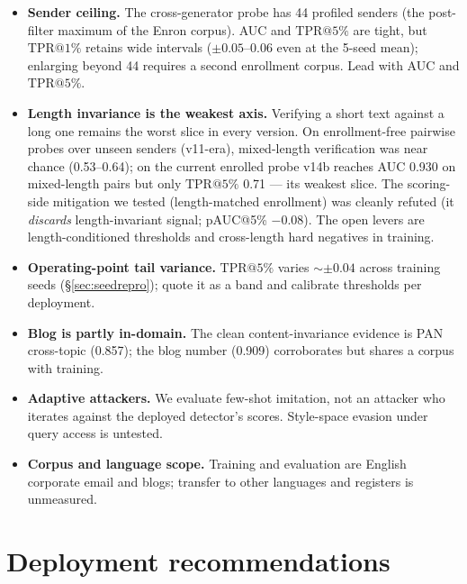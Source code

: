 \documentclass[11pt]{article}
\makeatletter
\newcommand{\tprat}[1]{\ensuremath{\mathrm{TPR}@#1\%}}
\newcommand{\vbest}{v14b}
\makeatother
\begin{document}
\begin{itemize}[leftmargin=2em]
\item \textbf{Sender ceiling.} The cross-generator probe has 44 profiled senders (the post-filter
      maximum of the Enron corpus). AUC and \tprat{5} are tight, but \tprat{1} retains wide
      intervals (${\pm}0.05$--$0.06$ even at the 5-seed mean); enlarging beyond 44 requires a second
      enrollment corpus. Lead with AUC and \tprat{5}.
\item \textbf{Length invariance is the weakest axis.} Verifying a short text against a long one
      remains the worst slice in every version. On enrollment-free pairwise probes over unseen
      senders (v11-era), mixed-length verification was near chance (0.53--0.64); on the current
      enrolled probe \vbest{} reaches AUC 0.930 on mixed-length pairs but only \tprat{5} 0.71 ---
      its weakest slice. The scoring-side mitigation we tested (length-matched enrollment) was
      cleanly refuted (it \emph{discards} length-invariant signal; pAUC@5\% $-0.08$). The open
      levers are length-conditioned thresholds and cross-length hard negatives in training.
\item \textbf{Operating-point tail variance.} \tprat{5} varies ${\sim}{\pm}0.04$ across training
      seeds (\S\ref{sec:seedrepro}); quote it as a band and calibrate thresholds per deployment.
\item \textbf{Blog is partly in-domain.} The clean content-invariance evidence is PAN cross-topic
      (0.857); the blog number (0.909) corroborates but shares a corpus with training.
\item \textbf{Adaptive attackers.} We evaluate few-shot imitation, not an attacker who iterates
      against the deployed detector's scores. Style-space evasion under query access is untested.
\item \textbf{Corpus and language scope.} Training and evaluation are English corporate email and
      blogs; transfer to other languages and registers is unmeasured.
\end{itemize}

\section{Deployment recommendations}
\label{sec:deploy}
\end{document}
